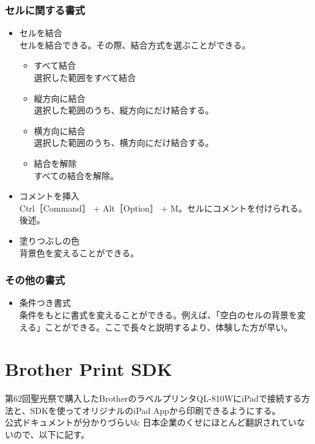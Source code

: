 \documentclass[dvipdfmx,jb5]{jreport}
\begin{document}
\subsubsection{セルに関する書式}
\begin{itemize}
      \item セルを結合\\
            セルを結合できる。その際、結合方式を選ぶことができる。
            \begin{itemize}
                  \item すべて結合\\
                        選択した範囲をすべて結合
                  \item 縦方向に結合\\
                        選択した範囲のうち、縦方向にだけ結合する。
                  \item 横方向に結合\\
                        選択した範囲のうち、横方向にだけ結合する。
                  \item 結合を解除\\
                        すべての結合を解除。
            \end{itemize}
      \item コメントを挿入\\
            Ctrl［Command］ + Alt［Option］ + M。セルにコメントを付けられる。後述。
      \item 塗りつぶしの色\\
            背景色を変えることができる。
\end{itemize}
\subsubsection{その他の書式}
\begin{itemize}
      \item 条件つき書式\\
            条件をもとに書式を変えることができる。例えば、「空白のセルの背景を変える」ことができる。ここで長々と説明するより、体験した方が早い。
\end{itemize}
\newpage
\section{Brother Print SDK}\label{sec:Brother Print SDK}
第62回聖光祭で購入したBrotherのラベルプリンタQL-810WにiPadで接続する方法と、SDKを使ってオリジナルのiPad Appから印刷できるようにする。\\
公式ドキュメントが分かりづらい\& 日本企業のくせにほとんど翻訳されていないので、以下に記す。
\end{document}
